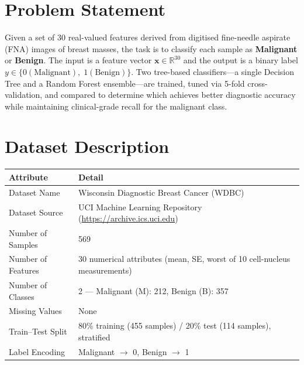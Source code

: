 \documentclass[12pt,a4paper]{article}
\begin{document}
\section{Problem Statement}
Given a set of 30 real-valued features derived from digitised fine-needle aspirate (FNA) images of breast
masses, the task is to classify each sample as \textbf{Malignant} or \textbf{Benign}.
The input is a feature vector $\mathbf{x} \in \mathbb{R}^{30}$ and the output is a binary label
$y \in \{0 (\text{Malignant}),\; 1 (\text{Benign})\}$.
Two tree-based classifiers---a single Decision Tree and a Random Forest ensemble---are trained,
tuned via 5-fold cross-validation, and compared to determine which achieves better diagnostic accuracy
while maintaining clinical-grade recall for the malignant class.

\section{Dataset Description}

\begin{longtable}{|p{5.5cm}|p{9cm}|}
\hline
\textbf{Attribute}      & \textbf{Detail} \\ \hline
Dataset Name            & Wisconsin Diagnostic Breast Cancer (WDBC) \\ \hline
Dataset Source          & UCI Machine Learning Repository (\url{https://archive.ics.uci.edu}) \\ \hline
Number of Samples       & 569 \\ \hline
Number of Features      & 30 numerical attributes (mean, SE, worst of 10 cell-nucleus measurements) \\ \hline
Number of Classes       & 2 --- Malignant (M): 212, Benign (B): 357 \\ \hline
Missing Values          & None \\ \hline
Train--Test Split       & 80\% training (455 samples) / 20\% test (114 samples), stratified \\ \hline
Label Encoding          & Malignant $\rightarrow$ 0, Benign $\rightarrow$ 1 \\ \hline
\end{longtable}
\end{document}

